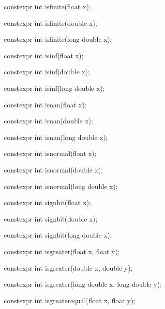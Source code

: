 \documentclass[prd,twocolumn,amsmath,amssymb,nofootinbib,eqsecnum]{revtex4-1}
\newcommand{\oldhighlight}[1]{#1}
\begin{document}
{\oldhighlight{constexpr} int isfinite(float x);

\oldhighlight{constexpr} int isfinite(double x);

\oldhighlight{constexpr} int isfinite(long double x);

\vspace{2ex}


\oldhighlight{constexpr} int isinf(float x);

\oldhighlight{constexpr} int isinf(double x);

\oldhighlight{constexpr} int isinf(long double x);

\vspace{2ex}


\oldhighlight{constexpr} int isnan(float x);

\oldhighlight{constexpr} int isnan(double x);

\oldhighlight{constexpr} int isnan(long double x);

\vspace{2ex}


\oldhighlight{constexpr} int isnormal(float x);

\oldhighlight{constexpr} int isnormal(double x);

\oldhighlight{constexpr} int isnormal(long double x);

\vspace{2ex}


\oldhighlight{constexpr} int signbit(float x);

\oldhighlight{constexpr} int signbit(double x);

\oldhighlight{constexpr} int signbit(long double x);

\vspace{2ex}


\oldhighlight{constexpr} int isgreater(float x, float y);

\oldhighlight{constexpr} int isgreater(double x, double y);

\oldhighlight{constexpr} int isgreater(long double x, long double y);

\vspace{2ex}


\oldhighlight{constexpr} int isgreaterequal(float x, float y);

}
\end{document}
